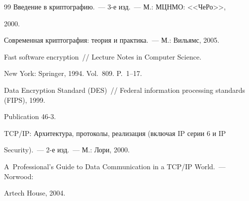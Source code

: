 {{\begin{thebibliography}{99}
 Введение в криптографию.~--- 3-е изд.~--- М.: МЦНМО: <<ЧеРо>>, 


2000. 




 Современная криптография: теория и практика.~--- М.: Вильямс, 2005.




 Fast software encryption~/\!\!/ Lecture Notes in Computer Science. 


New York: Springer, 1994. Vol.~809. P.~1--17.




Data Encryption Standard (DES)~/\!\!/ Federal information processing standards (FIPS), 1999. 


Publication 46-3.





 \label{end\stat}


 




 TCP/IP: Архитектура, протоколы, реализация (включая IP серии 6 и IP 


Security).~--- 2-е изд.~--- М.: Лори, 2000.




 A~Professional's Guide to Data Communication in a TCP/IP World.~--- Norwood: 


Artech House, 2004.


 \end{thebibliography}


}


}


